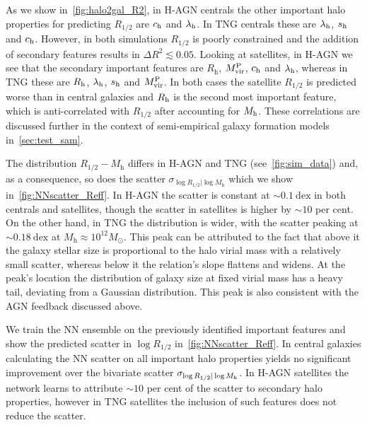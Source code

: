 \documentclass[usenatbib,useAMS]{mnras}
\begin{document}
As we show in~\cref{fig:halo2gal_R2}, in H-AGN centrals the other important halo properties for predicting $R_{1/2}$ are $c_{\rm h}$ and $\lambda_{\rm h}$. In TNG centrals these are $\lambda_{\rm h}$, $s_{\rm h}$ and $c_{\rm h}$. However, in both simulations $R_{1/2}$ is poorly constrained and the addition of secondary features results in $\Delta R^2 \lesssim 0.05$. Looking at satellites, in H-AGN we see that the secondary important features are $R_{\mathrm h}$, $M_{\rm vir}^{\rm P}$, $c_{\rm h}$ and $\lambda_{\rm h}$, whereas in TNG these are $R_{\rm h}$, $\lambda_{\rm h}$, $s_{\rm h}$ and $M_{\rm vir}^{\rm P}$. In both cases the satellite $R_{1/2}$ is predicted worse than in central galaxies and $R_{\rm h}$ is the second most important feature, which is anti-correlated with $R_{1/2}$ after accounting for $M_{\rm h}$. These correlations are discussed further in the context of semi-empirical galaxy formation models in~\cref{sec:test_sam}.

The distribution $R_{1/2} - M_\mathrm{h}$ differs in H-AGN and TNG (see~\cref{fig:sim_data}) and, as a consequence, so does the scatter $\sigma_{\log R_{1/2} | \log M_\mathrm{h}}$ which we show in~\cref{fig:NNscatter_Reff}. In H-AGN the scatter is constant at $\sim 0.1~\mathrm{dex}$ in both centrals and satellites, though the scatter in satellites is higher by $\sim 10$ per cent. On the other hand, in TNG the distribution is wider, with the scatter peaking at $\sim 0.18~\mathrm{dex}$ at $M_\mathrm{h}\approx 10^{12} M_\odot$. This peak can be attributed to the fact that above it the galaxy stellar size is proportional to the halo virial mass with a relatively small scatter, whereas below it the relation's slope flattens and widens. At the peak's location the distribution of galaxy size at fixed virial mass has a heavy tail, deviating from a Gaussian distribution. This peak is also consistent with the AGN feedback discussed above.

We train the NN ensemble on the previously identified important features and show the predicted scatter in $\log R_{1/2}$ in~\cref{fig:NNscatter_Reff}. In central galaxies calculating the NN scatter on all important halo properties yields no significant improvement over the bivariate scatter $\sigma_{\log R_{1/2} | \log M_{\rm h}}$. In H-AGN satellites the network learns to attribute $\sim10$ per cent of the scatter to secondary halo properties, however in TNG satellites the inclusion of such features does not reduce the scatter.
\end{document}
